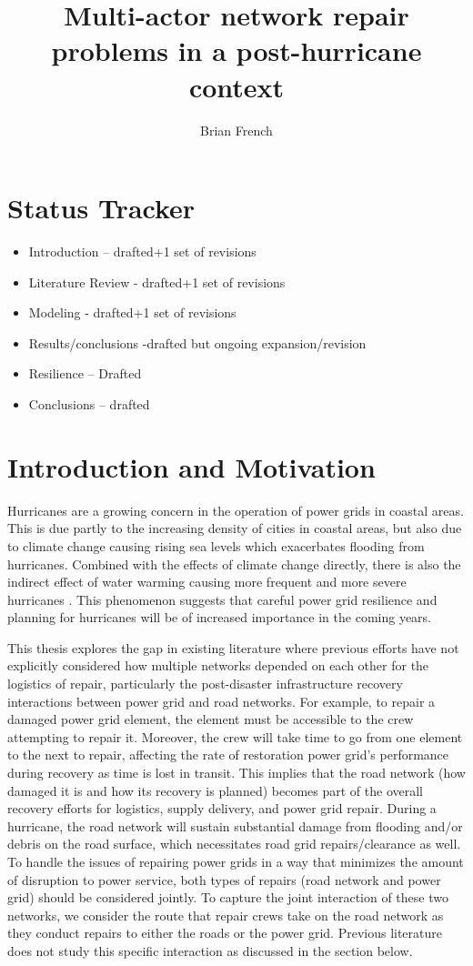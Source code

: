 \documentclass{article}
\begin{document}
	\title{Multi-actor network repair problems in a post-hurricane context}
	\author{Brian French}
	\maketitle
	\section{Status Tracker}
	\begin{itemize}
		\item Introduction -- drafted+1 set of revisions
		\item Literature Review - drafted+1 set of revisions
		\item Modeling - drafted+1 set of revisions
		\item Results/conclusions -drafted but ongoing expansion/revision
		\item Resilience -- Drafted
		\item Conclusions -- drafted
	\end{itemize}
	\doublespacing
	\section{Introduction and Motivation}
	Hurricanes are a growing concern in the operation of power grids in coastal areas. This is due partly to the increasing density of cities in coastal areas, but also due to climate change causing rising sea levels which exacerbates flooding from hurricanes. Combined with the effects of climate change directly, there is also the indirect effect of water warming causing more frequent and more severe hurricanes \cite{MannEA2006}. This phenomenon suggests that careful power grid resilience and planning for hurricanes will be of increased importance in the coming years.
	
	This thesis explores the gap in existing literature where previous efforts have not explicitly considered how multiple networks depended on each other for the logistics of repair, particularly the post-disaster infrastructure recovery interactions between power grid and road networks. For example, to repair a damaged power grid element, the element must be accessible to the crew attempting to repair it. Moreover, the crew will take time to go from one element to the next to repair, affecting the rate of restoration power grid's performance during recovery as time is lost in transit. This implies that the road network (how damaged it is and how its recovery is planned) becomes part of the overall recovery efforts for logistics, supply delivery, and power grid repair. During a hurricane, the road network will sustain substantial damage from flooding and/or debris on the road surface, which necessitates road grid repairs/clearance as well. To handle the issues of repairing power grids in a way that minimizes the amount of disruption to power service, both types of repairs (road network and power grid) should be considered jointly. To capture the joint interaction of these two networks, we consider the route that repair crews take on the road network as they conduct repairs to either the roads or the power grid. Previous literature does not study this specific interaction as discussed in the section below.
\end{document}
